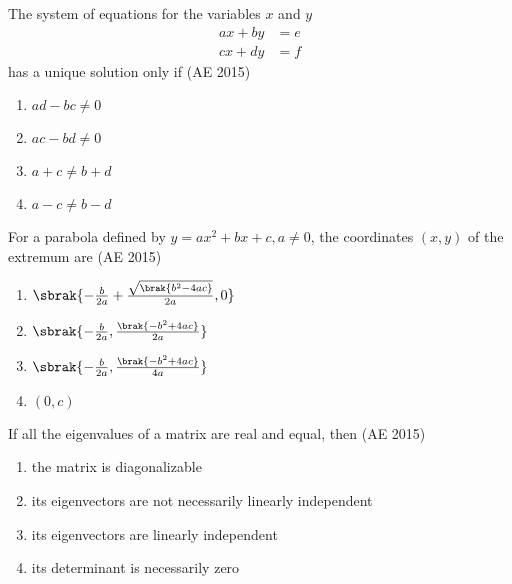 \item The system of equations for the variables $x$ and $y$
\begin{align*}
    a x + b y &= e\\
    c x + d y &= f
\end{align*}
has a unique solution only if
\hfill (AE 2015)
\begin{multicols}{4}
\begin{enumerate}
\item $a d - b c \ne 0$
\item $a c - b d \ne 0$
\item $a + c  \ne b + d$
\item $a - c \ne b - d $
\end{enumerate}
\end{multicols}
\item For a parabola defined by $y = ax^2 + bx + c, a \neq 0$, the coordinates $(x, y)$ of the extremum are
\hfill (AE 2015)
\begin{multicols}{2}
	\begin{enumerate}[itemsep=1ex]
	\item $\sbrak{-\frac{b}{2a} +  \frac{\sqrt{\brak{b^{2}-4ac}}}{2a}, 0}$
	\item $\sbrak{-\frac{b}{2a}, \frac{\brak{-b^{2}+4ac}}{2a}}$
\item $\sbrak{-\frac{b}{2a}, \frac{\brak{-b^{2}+4ac}}{4a}}$
\item $(0, c)$
\end{enumerate}
\end{multicols}
\item If all the eigenvalues of a matrix are real and equal, then
\hfill (AE 2015)
\begin{enumerate}
\item the matrix is diagonalizable
\item its eigenvectors are not necessarily linearly independent
\item its eigenvectors are linearly independent
\item its determinant is necessarily zero
\end{enumerate}

